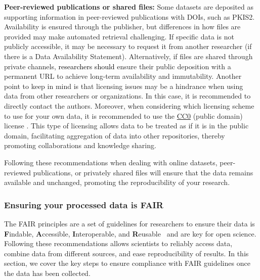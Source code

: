 \documentclass[9pt,lessons]{livecoms}
\newcommand{\revision}[1]{\textcolor{black}{#1}}
\begin{document}
\textbf{Peer-reviewed publications or shared files:} 
Some datasets are deposited as supporting information in peer-reviewed publications with DOIs, such as PKIS2.~\cite{drewry2017progress} 
Availability is ensured through the publisher, but differences in how files are provided may make automated retrieval challenging. 
If specific data is not publicly accessible, it may be necessary to request it from another researcher (if there is a Data Availability Statement). 
Alternatively, if files are shared through private channels, \revision{researchers should} ensure their public deposition with a permanent URL to achieve long-term availability and immutability.  
Another point to keep in mind is that licensing issues may be a hindrance when using data from other researchers or organizations. 
In this case, it is recommended to directly contact the authors. Moreover, when considering which licensing scheme to use for your own data, it is recommended to use the \href{https://creativecommons.org/public-domain/cc0/}{CC0} (public domain) license \cite{stodden2009enabling}. This type of licensing allows data to be treated as if it is in the public domain, facilitating aggregation of data into other repositories, thereby promoting collaborations and knowledge sharing. 

Following these recommendations when dealing with online datasets, peer-reviewed publications, or privately shared files will ensure that the data remains available and unchanged, promoting the reproducibility of your research.




\subsubsection{Ensuring your processed data is FAIR}

The FAIR principles are a set of guidelines for researchers to ensure their data is \textbf{F}indable, \textbf{A}ccessible, \textbf{I}nteroperable, and \textbf{R}eusable~\cite{wilkinson2016fair} and are key for open science. 
Following these recommendations allows scientists to reliably access data, combine data from different sources, and ease reproducibility of results.  
In this section, we cover the key steps to ensure compliance with FAIR guidelines once the data has been collected.
\end{document}
